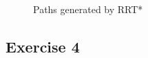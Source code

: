 \documentclass[12pt,a4paper]{article}
\begin{document}
\begin{enumerate}[label=(\alph*)]
\begin{figure}[h!]
		\qquad
		\caption{Paths generated by RRT*}		
		\label{fig:rrt-star}%
	\end{figure}

\end{enumerate}
\subsection*{Exercise 4}
\end{document}
